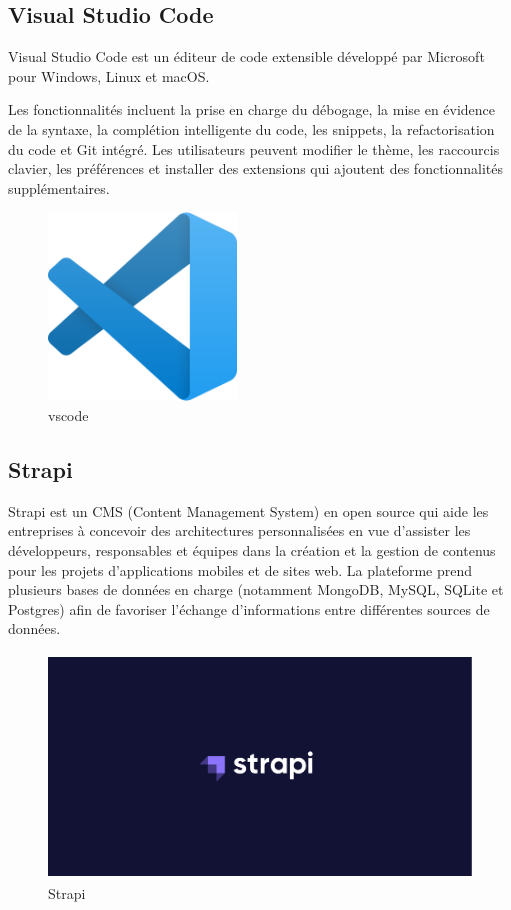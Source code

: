 \subsection{Visual Studio Code}

Visual Studio Code est un éditeur de code extensible développé par Microsoft pour Windows, Linux et macOS.

Les fonctionnalités incluent la prise en charge du débogage, la mise en évidence de la syntaxe, la complétion intelligente du code, les snippets, la refactorisation du code et Git intégré. Les utilisateurs peuvent modifier le thème, les raccourcis clavier, les préférences et installer des extensions qui ajoutent des fonctionnalités supplémentaires.

\begin{figure}[!h]
\begin{center}
\includegraphics[height=5cm]{vscode.svg.png}
\end{center}
\caption{vscode}
\end{figure}


\subsection{Strapi}

Strapi est un CMS (Content Management System) en open source qui aide les entreprises à concevoir des architectures personnalisées en vue d'assister les développeurs, responsables et équipes dans la création et la gestion de contenus pour les projets d'applications mobiles et de sites web. La plateforme prend plusieurs bases de données en charge (notamment MongoDB, MySQL, SQLite et Postgres) afin de favoriser l'échange d'informations entre différentes sources de données.

\begin{figure}[!h]
\begin{center}
\includegraphics[height=6cm]{strapi.png}
\end{center}
\caption{Strapi}
\end{figure}



